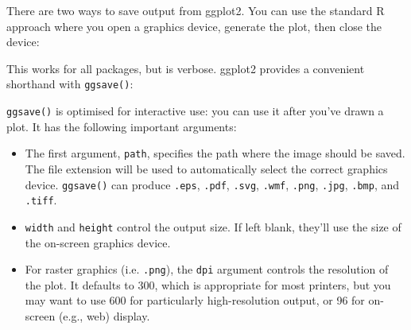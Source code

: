 There are two ways to save output from ggplot2. You can use the standard
R approach where you open a graphics device, generate the plot, then
close the device: 

\begin{Shaded}
\begin{Highlighting}[]
\NormalTok{(}\NormalTok{, } \NormalTok{, } \NormalTok{)}
\StringTok{ }\NormalTok{()}
\NormalTok{()}
\end{Highlighting}
\end{Shaded}

This works for all packages, but is verbose. ggplot2 provides a
convenient shorthand with \texttt{ggsave()}:

\begin{Shaded}
\begin{Highlighting}[]
\StringTok{ }\NormalTok{()}
\NormalTok{(}\NormalTok{)}
\end{Highlighting}
\end{Shaded}

\texttt{ggsave()} is optimised for interactive use: you can use it after
you've drawn a plot. It has the following important arguments:

\begin{itemize}
\item
  The first argument, \texttt{path}, specifies the path where the image
  should be saved. The file extension will be used to automatically
  select the correct graphics device. \texttt{ggsave()} can produce
  \texttt{.eps}, \texttt{.pdf}, \texttt{.svg}, \texttt{.wmf},
  \texttt{.png}, \texttt{.jpg}, \texttt{.bmp}, and \texttt{.tiff}.
\item
  \texttt{width} and \texttt{height} control the output size. If left
  blank, they'll use the size of the on-screen graphics device.
\item
  For raster graphics (i.e. \texttt{.png}), the \texttt{dpi} argument
  controls the resolution of the plot. It defaults to 300, which is
  appropriate for most printers, but you may want to use 600 for
  particularly high-resolution output, or 96 for on-screen (e.g., web)
  display.
\end{itemize}

